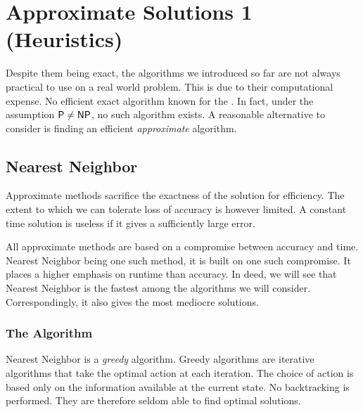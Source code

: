 \chapter{Approximate Solutions 1 (Heuristics)}

Despite them being exact, the algorithms we introduced so far are not always practical to use on a real world problem. This is due to their computational expense. No efficient exact algorithm known for the \TSP. In fact, under the assumption \(\textsf{P}\neq\textsf{NP}\), no such algorithm exists. A reasonable alternative to consider is finding an efficient \emph{approximate} algorithm.

\section{Nearest Neighbor}

    Approximate methods sacrifice the exactness of the solution for efficiency. The extent to which we can tolerate loss of accuracy is however limited. A constant time solution is useless if it gives a sufficiently large error. 
    
    All approximate methods are based on a compromise between accuracy and time. Nearest Neighbor being one such method, it is built on one such compromise. It places a higher emphasis on runtime than accuracy. In deed, we will see that Nearest Neighbor is the fastest among the algorithms we will consider. Correspondingly, it also gives the most mediocre solutions.

    \subsection{The Algorithm}

    Nearest Neighbor is a \emph{greedy} algorithm. Greedy algorithms are iterative algorithms that take the optimal action at each iteration. The choice of action is based only on the information available at the current state. No backtracking is performed. They are therefore seldom able to find optimal solutions.

